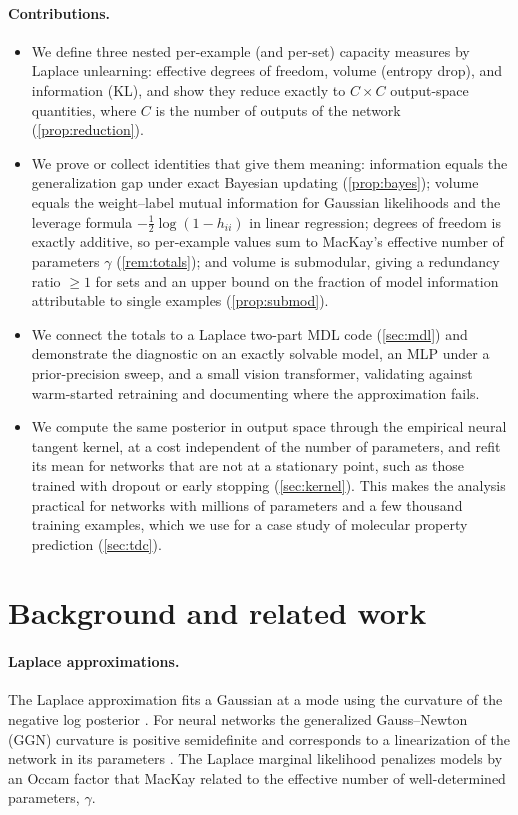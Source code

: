 \documentclass[10pt,twocolumn,letterpaper]{article}
\theoremstyle{definition}
\begin{document}
\paragraph{Contributions.}
\begin{itemize}
\item We define three nested per-example (and per-set) capacity measures by Laplace unlearning: effective degrees of freedom, volume (entropy drop), and information (KL), and show they reduce exactly to $C\times C$ output-space quantities, where $C$ is the number of outputs of the network (\cref{prop:reduction}).
\item We prove or collect identities that give them meaning: information equals the generalization gap under exact Bayesian updating (\cref{prop:bayes}); volume equals the weight--label mutual information for Gaussian likelihoods and the leverage formula $-\tfrac12\log(1-h_{ii})$ in linear regression; degrees of freedom is exactly additive, so per-example values sum to MacKay's effective number of parameters $\gamma$ (\cref{rem:totals}); and volume is submodular, giving a redundancy ratio $\ge 1$ for sets and an upper bound on the fraction of model information attributable to single examples (\cref{prop:submod}).
\item We connect the totals to a Laplace two-part MDL code (\cref{sec:mdl}) and demonstrate the diagnostic on an exactly solvable model, an MLP under a prior-precision sweep, and a small vision transformer, validating against warm-started retraining and documenting where the approximation fails.
\item We compute the same posterior in output space through the empirical neural tangent kernel, at a cost independent of the number of parameters, and refit its mean for networks that are not at a stationary point, such as those trained with dropout or early stopping (\cref{sec:kernel}). This makes the analysis practical for networks with millions of parameters and a few thousand training examples, which we use for a case study of molecular property prediction (\cref{sec:tdc}).
\end{itemize}

\section{Background and related work}
\paragraph{Laplace approximations.} The Laplace approximation fits a Gaussian at a mode using the curvature of the negative log posterior \citep{mackay1992}. For neural networks the generalized Gauss--Newton (GGN) curvature is positive semidefinite and corresponds to a linearization of the network in its parameters \citep{ritter2018,immer2021,daxberger2021}. The Laplace marginal likelihood penalizes models by an Occam factor that MacKay related to the effective number of well-determined parameters, $\gamma$.
\end{document}
